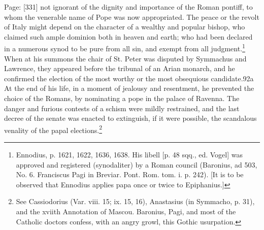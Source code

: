 Page: [331] not ignorant of the dignity and importance of the Roman pontiff, to whom the venerable name of Pope was now appropriated. The peace or the revolt of Italy might depend on the character of a wealthy and popular bishop, who claimed such ample dominion both in heaven and earth; who had been declared in a numerous synod to be pure from all sin, and exempt from all judgment.\footnote{Ennodius, p. 1621, 1622, 1636, 1638. His libell [p. 48 sqq., ed. Vogel] was approved and registered (synodaliter) by a Roman council (Baronius, ad 503, No. 6. Franciscus Pagi in Breviar. Pont. Rom. tom. i. p. 242). [It is to be observed that Ennodius applies papa once or twice to Epiphanius.]} When at his summons the chair of St. Peter was disputed by Symmachus and Lawrence, they appeared before the tribunal of an Arian monarch, and he confirmed the election of the most worthy or the most obsequious candidate.92a At the end of his life, in a moment of jealousy and resentment, he prevented the choice of the Romans, by nominating a pope in the palace of Ravenna. The danger and furious contests of a schism were mildly restrained, and the last decree of the senate was enacted to extinguish, if it were possible, the scandalous venality of the papal elections.\footnote{See Cassiodorius (Var. viii. 15; ix. 15, 16), Anastasius (in Symmacho, p. 31), and the xviith Annotation of Mascou. Baronius, Pagi, and most of the Catholic doctors confess, with an angry growl, this Gothic usurpation.}

